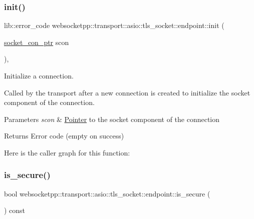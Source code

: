 \subsubsection{\texorpdfstring{init()}{init()}}
{\footnotesize\ttfamily lib\+::error\+\_\+code websocketpp\+::transport\+::asio\+::tls\+\_\+socket\+::endpoint\+::init (\begin{DoxyParamCaption}\item[{\mbox{\hyperlink{classwebsocketpp_1_1transport_1_1asio_1_1tls__socket_1_1endpoint_ad0babd14e53524633840467d072710c3}{socket\+\_\+con\+\_\+ptr}}}]{scon }\end{DoxyParamCaption})\hspace{0.3cm}{\ttfamily [inline]}, {\ttfamily [protected]}}



Initialize a connection. 

Called by the transport after a new connection is created to initialize the socket component of the connection.


\begin{DoxyParams}{Parameters}
{\em scon} & \mbox{\hyperlink{struct_pointer}{Pointer}} to the socket component of the connection\\
\hline
\end{DoxyParams}
\begin{DoxyReturn}{Returns}
Error code (empty on success) 
\end{DoxyReturn}
Here is the caller graph for this function\+:
\mbox{\label{classwebsocketpp_1_1transport_1_1asio_1_1tls__socket_1_1endpoint_aaaf0047506bbbd83d2da026970fc3bf8}} 
\subsubsection{\texorpdfstring{is\+\_\+secure()}{is\_secure()}}
{\footnotesize\ttfamily bool websocketpp\+::transport\+::asio\+::tls\+\_\+socket\+::endpoint\+::is\+\_\+secure (\begin{DoxyParamCaption}{ }\end{DoxyParamCaption}) const\hspace{0.3cm}{\ttfamily [inline]}}



